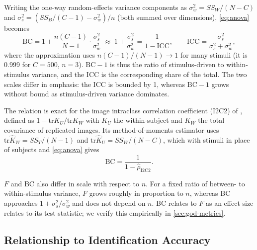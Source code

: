 \documentclass[11pt,a4paper]{article}
\begin{document}
Writing the one-way random-effects variance components as
$\sigma_w^2=SS_W/(N-C)$ and $\sigma_s^2=(SS_B/(C-1)-\sigma_w^2)/n$ (both summed
over dimensions), \cref{eq:anova} becomes
\begin{equation}
  \mathrm{BC} = 1 + \frac{n(C-1)}{N-1}\cdot\frac{\sigma_s^2}{\sigma_w^2}
  \;\approx\; 1 + \frac{\sigma_s^2}{\sigma_w^2}
  = \frac{1}{1-\mathrm{ICC}},
  \qquad
  \mathrm{ICC} = \frac{\sigma_s^2}{\sigma_s^2+\sigma_w^2},
  \label{eq:icc}
\end{equation}
where the approximation uses $n(C-1)/(N-1)\to 1$ for many stimuli (it is 0.999
for $C=500$, $n=3$). $\mathrm{BC}-1$ is thus the ratio of stimulus-driven to
within-stimulus variance, and the ICC is the corresponding share of the total.
The two scales differ in emphasis: the ICC is bounded by 1, whereas $\mathrm{BC}-1$
grows without bound as stimulus-driven variance dominates.

The relation is exact for the image intraclass correlation coefficient (I2C2) of
\citet{shou2013}, defined as $1-\mathrm{tr}K_U/\mathrm{tr}K_W$ with $K_U$ the
within-subject and $K_W$ the total covariance of replicated images. Its
method-of-moments estimator uses $\mathrm{tr}\hat K_W=SS_T/(N-1)$ and
$\mathrm{tr}\hat K_U=SS_W/(N-C)$, which with stimuli in place of subjects and
\cref{eq:anova} gives
\begin{equation}
  \mathrm{BC}=\frac{1}{1-\hat\rho_\mathrm{I2C2}}.
\end{equation}

$F$ and BC also differ in scale with respect to $n$. For a fixed ratio of
between- to within-stimulus variance, $F$ grows roughly in proportion to $n$,
whereas BC approaches $1+\sigma_s^2/\sigma_w^2$ and does not depend on $n$. BC
relates to $F$ as an effect size relates to its test statistic; we verify this
empirically in \cref{sec:god-metrics}.

\subsection{Relationship to Identification Accuracy}
\label{sec:ident-theory}
\end{document}

